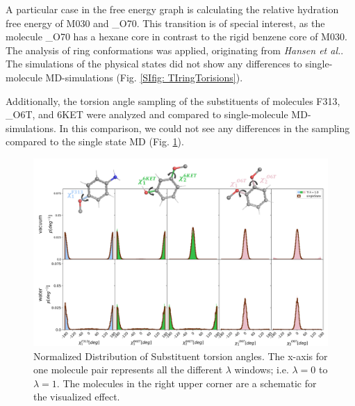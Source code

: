 A particular case in the free energy graph is calculating the relative hydration free energy of M030 and \_O70. This transition is of special interest, as the molecule \_O70 has a hexane core in contrast to the rigid benzene core of M030. The analysis of ring conformations was applied, originating from  \textit{Hansen et al.}.\cite{Hansen2010} The simulations of the physical states did not show any differences to single-molecule MD-simulations (Fig. \ref{SIfig: TIringTorisions}).

Additionally, the torsion angle sampling of the substituents of molecules F313, \_O6T, and 6KET were analyzed and compared to single-molecule MD-simulations. In this comparison, we could not see any differences in the sampling compared to the single state MD  (Fig. \ref{fig: TIsubsTorisions}). 

\begin{figure}[h]
    \centering
    \includegraphics[width=\textwidth]{fig/results/pairwise/sampling/torsions/TI_all_substorsion_ana_partnerM030_singleState_populations_total.png}
    \caption{Normalized Distribution of Substituent torsion angles. The x-axis for one molecule pair represents all the different $\lambda$ windows; i.e. $\lambda = 0$ to $\lambda = 1$.  The molecules in the right upper corner are a schematic for the visualized effect.}
    \label{fig: TIsubsTorisions}
\end{figure}



